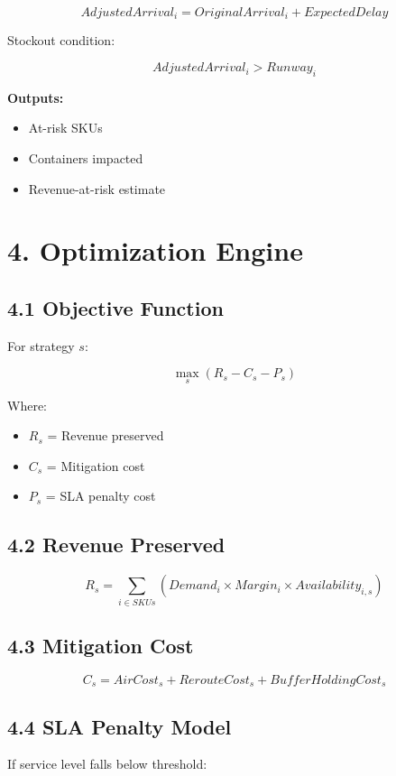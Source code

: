 \documentclass[11pt]{article}
\begin{document}
\[
AdjustedArrival_i = OriginalArrival_i + ExpectedDelay
\]

Stockout condition:

\[
AdjustedArrival_i > Runway_i
\]

\textbf{Outputs:}
\begin{itemize}
    \item At-risk SKUs
    \item Containers impacted
    \item Revenue-at-risk estimate
\end{itemize}

\section*{4. Optimization Engine}

\subsection*{4.1 Objective Function}

For strategy $s$:

\[
\max_{s} \left( R_s - C_s - P_s \right)
\]

Where:

\begin{itemize}
    \item $R_s$ = Revenue preserved
    \item $C_s$ = Mitigation cost
    \item $P_s$ = SLA penalty cost
\end{itemize}

\subsection*{4.2 Revenue Preserved}

\[
R_s = \sum_{i \in SKUs} (Demand_i \times Margin_i \times Availability_{i,s})
\]

\subsection*{4.3 Mitigation Cost}

\[
C_s = AirCost_s + RerouteCost_s + BufferHoldingCost_s
\]

\subsection*{4.4 SLA Penalty Model}

If service level falls below threshold:
\end{document}
